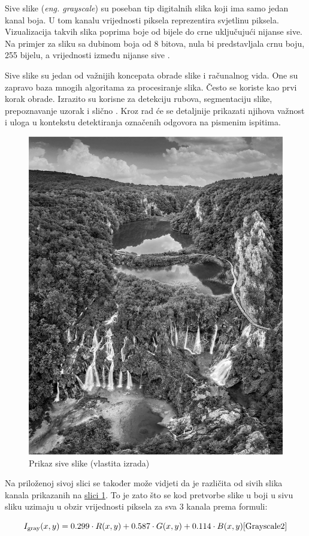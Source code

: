 \documentclass{foi}
\begin{document}
Sive slike (\textit{eng. grayscale}) su poseban tip digitalnih slika koji ima samo jedan kanal boja. U tom kanalu vrijednosti piksela reprezentira svjetlinu piksela. Vizualizacija takvih slika poprima boje od bijele do crne uključujući nijanse sive. Na primjer za sliku sa dubinom boja od 8 bitova, nula bi predstavljala crnu boju, 255 bijelu, a vrijednosti između nijanse sive \cite{GrayscaleSlika}.

Sive slike su jedan od važnijih koncepata obrade slike i računalnog vida. One su zapravo baza mnogih algoritama za procesiranje slika. Često se koriste kao prvi korak obrade. Izrazito su korisne za detekciju rubova, segmentaciju slike, prepoznavanje uzorak i slično \cite{Grayscale2}. Kroz rad će se detaljnije prikazati njihova važnost i uloga u kontekstu detektiranja označenih odgovora na pismenim ispitima. 

\begin{figure}[H]
    \centering
    \includegraphics[width=0.7\linewidth]{slike/Grayscale.jpeg}
    \caption{Prikaz sive slike (vlastita izrada)}
\end{figure}

Na priloženoj sivoj slici se također može vidjeti da je različita od sivih slika kanala prikazanih na \hyperref[fig:channels]{slici 1}. To je zato što se kod pretvorbe slike u boji u sivu sliku uzimaju u obzir vrijednosti piksela za sva 3 kanala prema formuli:

{\large
\[
    I_{\text{gray}}(x, y) = 0.299 \cdot R(x, y) + 0.587 \cdot G(x, y) + 0.114 \cdot B(x, y)\text{\cite{Grayscale2}}
\]
}
\end{document}
